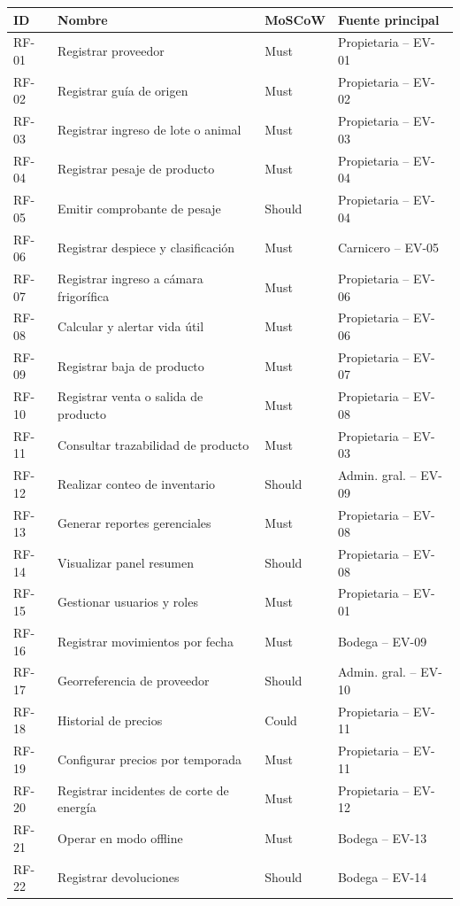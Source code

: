 \documentclass[11pt,a4paper]{article}
\begin{document}
\begin{longtable}{|p{1.2cm}|p{5.5cm}|p{1.8cm}|p{4.5cm}|}
\hline
\textbf{ID} & \textbf{Nombre} & \textbf{MoSCoW} & \textbf{Fuente principal} \\
\hline
RF-01 & Registrar proveedor & Must & Propietaria -- EV-01 \\
RF-02 & Registrar guía de origen & Must & Propietaria -- EV-02 \\
RF-03 & Registrar ingreso de lote o animal & Must & Propietaria -- EV-03 \\
RF-04 & Registrar pesaje de producto & Must & Propietaria -- EV-04 \\
RF-05 & Emitir comprobante de pesaje & Should & Propietaria -- EV-04 \\
RF-06 & Registrar despiece y clasificación & Must & Carnicero -- EV-05 \\
RF-07 & Registrar ingreso a cámara frigorífica & Must & Propietaria -- EV-06 \\
RF-08 & Calcular y alertar vida útil & Must & Propietaria -- EV-06 \\
RF-09 & Registrar baja de producto & Must & Propietaria -- EV-07 \\
RF-10 & Registrar venta o salida de producto & Must & Propietaria -- EV-08 \\
RF-11 & Consultar trazabilidad de producto & Must & Propietaria -- EV-03 \\
RF-12 & Realizar conteo de inventario & Should & Admin. gral. -- EV-09 \\
RF-13 & Generar reportes gerenciales & Must & Propietaria -- EV-08 \\
RF-14 & Visualizar panel resumen & Should & Propietaria -- EV-08 \\
RF-15 & Gestionar usuarios y roles & Must & Propietaria -- EV-01 \\
RF-16 & Registrar movimientos por fecha & Must & Bodega -- EV-09 \\
RF-17 & Georreferencia de proveedor & Should & Admin. gral. -- EV-10 \\
RF-18 & Historial de precios & Could & Propietaria -- EV-11 \\
RF-19 & Configurar precios por temporada & Must & Propietaria -- EV-11 \\
RF-20 & Registrar incidentes de corte de energía & Must & Propietaria -- EV-12 \\
RF-21 & Operar en modo offline & Must & Bodega -- EV-13 \\
RF-22 & Registrar devoluciones & Should & Bodega -- EV-14 \\

\end{longtable}
\end{document}
